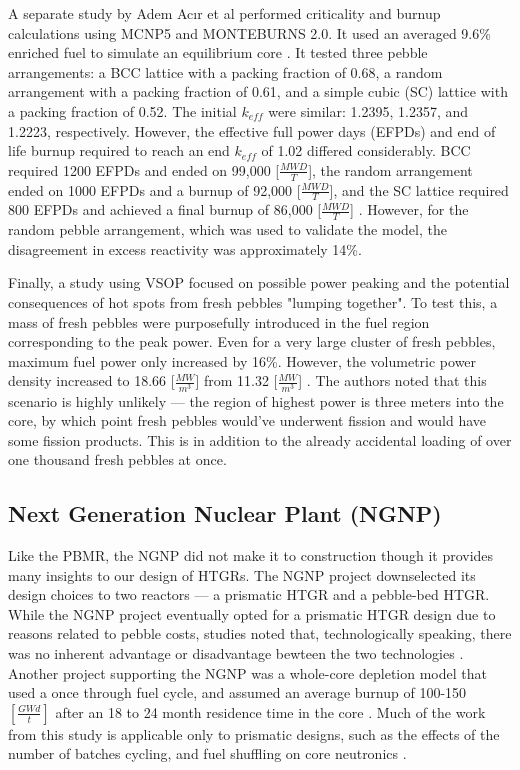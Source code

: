 A separate study by Adem Acır et al performed criticality and burnup calculations using MCNP5 and MONTEBURNS 2.0.  It used an averaged 9.6\% enriched fuel to simulate an equilibrium core \cite{noauthor_criticality_2011}.  It tested three pebble arrangements:  a BCC lattice with a packing fraction of 0.68, a random arrangement with a packing fraction of 0.61, and a simple cubic (SC) lattice with a packing fraction of 0.52.  The initial $k_{eff}$ were similar: 1.2395, 1.2357, and 1.2223, respectively.  However, the effective full power days (EFPDs) and end of life burnup required to reach an end $k_{eff}$  of 1.02 differed considerably.  BCC required 1200 EFPDs and ended on 99,000 [$\frac{MWD}{T}$], the random arrangement ended on 1000 EFPDs and a burnup of 92,000 [$\frac{MWD}{T}$], and the SC lattice required 800 EFPDs and achieved a final burnup of 86,000 [$\frac{MWD}{T}$] \cite{noauthor_criticality_2011}.  However, for the random pebble arrangement, which was used to validate the model, the disagreement in excess reactivity was approximately 14\%.

Finally, a study using VSOP focused on possible power peaking and the potential consequences of hot spots \cite{reitsma_investigation_2005} from fresh pebbles "lumping together".  To test this, a mass of fresh pebbles were purposefully introduced in the fuel region corresponding to the peak power.  Even for a very large cluster of fresh pebbles, maximum fuel power only increased by 16\%.  However, the volumetric power density increased to 18.66 [$\frac{MW}{m^3}$] from 11.32 [$\frac{MW}{m^3}$] \cite{reitsma_investigation_2005}.  The authors noted that this scenario is highly unlikely --- the region of highest power is three meters into the core, by which point fresh pebbles would've underwent fission and would have some fission products.  This is in addition to the already accidental loading of over one thousand fresh pebbles at once.

\subsection{Next Generation Nuclear Plant (NGNP)}

Like the PBMR, the NGNP did not make it to construction though it provides many insights to our design of HTGRs.  The NGNP project downselected its design choices to two reactors --- a prismatic HTGR and a pebble-bed HTGR.  While the NGNP project eventually opted for a prismatic HTGR design \cite{noauthor_areva_nodate} due to reasons related to pebble costs, studies noted that, technologically speaking, there was no inherent advantage or disadvantage bewteen the two technologies \cite{inl_basis_2011}.  Another project supporting the NGNP was a whole-core depletion model that used a once through fuel cycle, and assumed an average burnup of 100-150 $\left[\frac{GWd}{t}\right]$ after an 18 to 24 month residence time in the core \cite{tkkim_whole-core_nodate}.  Much of the work from this study is applicable only to prismatic designs, such as the effects of the number of batches cycling, and fuel shuffling on core neutronics \cite{tkkim_whole-core_nodate}.


